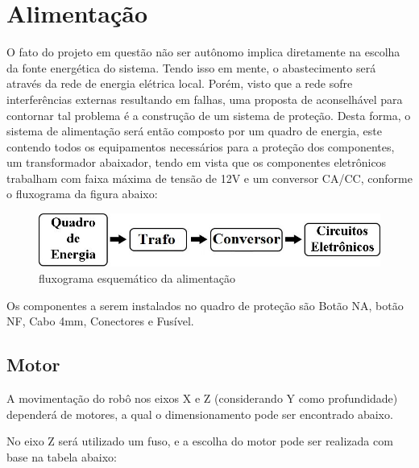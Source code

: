 \section[Alimentação]{Alimentação}

O fato do projeto em questão não ser autônomo implica diretamente na escolha da fonte energética do sistema. Tendo isso em mente, o abastecimento será através da rede de energia elétrica local.
Porém, visto que a rede sofre interferências externas resultando em falhas, uma proposta de aconselhável para contornar tal problema é a construção de um sistema de proteção.
Desta forma, o sistema de alimentação será então composto por um quadro de energia, este contendo todos os equipamentos necessários para a proteção dos componentes, um transformador abaixador, tendo em vista que os componentes eletrônicos trabalham com faixa máxima de tensão de 12V e um conversor CA/CC, conforme o fluxograma da figura abaixo: 

\begin{figure}[!h]
\centering
\includegraphics[scale=0.6, angle = 360]{figuras/fluxograma}
\caption[]{fluxograma esquemático da alimentação}
\label{fluxograma esquemático da alimentação}
\end{figure}
\FloatBarrier

Os componentes a serem instalados no quadro de proteção são Botão NA, botão NF, Cabo 4mm, Conectores e Fusível.

\subsection{Motor}
A movimentação do robô nos eixos X e Z (considerando Y como profundidade) dependerá de motores, a qual o dimensionamento pode ser encontrado abaixo.

No eixo Z será utilizado um fuso, e a escolha do motor pode ser realizada com base na tabela abaixo:

